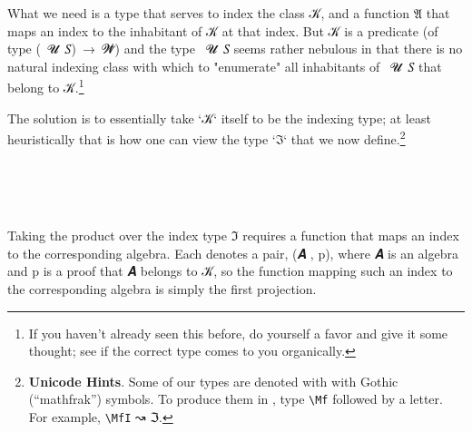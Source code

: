 What we need is a type that serves to index the class \ab 𝒦, and a function \af 𝔄 that maps an index to the inhabitant of \ab 𝒦 at that index. But \ab 𝒦 is a predicate (of type (~\ab 𝓤~\ab 𝑆)~\as →~\ab 𝓦\af ̇) and the type ~\ab 𝓤~\ab 𝑆 seems rather nebulous in that there is no natural indexing class with which to "enumerate" all inhabitants of ~\ab 𝓤~\ab 𝑆 that belong to \ab 𝒦.\footnote{%
If you haven't already seen this before, do yourself a favor and give it some thought; see if the correct type comes to you organically.}


The solution is to essentially take `𝒦` itself to be the indexing type; at least heuristically that is how one can view the type `ℑ` that we now define.\footnote{\textbf{Unicode Hints}. Some of our types are denoted with with Gothic (``mathfrak'') symbols. To produce them in \agdamode, type \texttt{\textbackslash{}Mf} followed by a letter. For example, \texttt{\textbackslash{}MfI} ↝ \af ℑ.}
\ccpad
\begin{code}%
\>[0]\AgdaSpace{}%
\AgdaSpace{}%
\AgdaSymbol{\{}\AgdaSpace{}%
\AgdaSymbol{:}\AgdaSpace{}%
\AgdaSymbol{\}}\AgdaSpace{}%
\AgdaSymbol{(}\AgdaSpace{}%
\AgdaSymbol{:}\AgdaSpace{}%
\AgdaSpace{}%
\AgdaSymbol{(}\AgdaSpace{}%
\AgdaSpace{}%
\AgdaSymbol{)(}\AgdaSpace{}%
\AgdaSymbol{))}\AgdaSpace{}%
\<%
\\
%
\\[\AgdaEmptyExtraSkip]%
\>[0][@{}l@{\AgdaIndent{0}}]%
\>[1]\AgdaSpace{}%
\AgdaSymbol{:}\AgdaSpace{}%
\AgdaSpace{}%
\AgdaSpace{}%
\<%
\\
%
\>[1]\AgdaSpace{}%
\AgdaSymbol{=}\AgdaSpace{}%
\AgdaSpace{}%
\AgdaSpace{}%
\AgdaSpace{}%
\AgdaSymbol{(}\AgdaSpace{}%
\AgdaSpace{}%
\AgdaSymbol{)}\AgdaSpace{}%
\AgdaFunction{,}\AgdaSpace{}%
\AgdaSymbol{(}\AgdaSpace{}%
\AgdaSpace{}%
\AgdaSymbol{)}\<%
\end{code}
\ccpad
Taking the product over the index type \af ℑ requires a function that maps an index  to the corresponding algebra.  Each  denotes a pair, (\ab 𝑨 , \ab p), where \ab 𝑨 is an algebra and \ab p is a proof that \ab 𝑨 belongs to \ab 𝒦, so the function mapping such an index to the corresponding algebra is simply the first projection.
